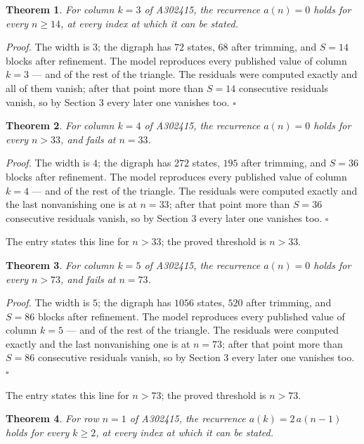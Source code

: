 \documentclass[11pt]{article}
\newtheorem{theorem}{Theorem}
\theoremstyle{definition}
\begin{document}
\begin{theorem} For column $k = 3$ of A302415, the recurrence $a(n) = 0$ holds for every $n \ge 14$, at every index at which it can be stated.\end{theorem}

{\itshape Proof.} The width is $3$; the digraph has $72$ states, $68$ after trimming, and $S = 14$ blocks after refinement. The model reproduces every published value of column $k = 3$ --- and of the rest of the triangle. The residuals were computed exactly and all of them vanish; after that point more than $S = 14$ consecutive residuals vanish, so by Section 3 every later one vanishes too. $\square$

\begin{theorem} For column $k = 4$ of A302415, the recurrence $a(n) = 0$ holds for every $n > 33$, and fails at $n = 33$.\end{theorem}

{\itshape Proof.} The width is $4$; the digraph has $272$ states, $195$ after trimming, and $S = 36$ blocks after refinement. The model reproduces every published value of column $k = 4$ --- and of the rest of the triangle. The residuals were computed exactly and the last nonvanishing one is at $n = 33$; after that point more than $S = 36$ consecutive residuals vanish, so by Section 3 every later one vanishes too. $\square$

The entry states this line for $n > 33$; the proved threshold is $n > 33$.

\begin{theorem} For column $k = 5$ of A302415, the recurrence $a(n) = 0$ holds for every $n > 73$, and fails at $n = 73$.\end{theorem}

{\itshape Proof.} The width is $5$; the digraph has $1056$ states, $520$ after trimming, and $S = 86$ blocks after refinement. The model reproduces every published value of column $k = 5$ --- and of the rest of the triangle. The residuals were computed exactly and the last nonvanishing one is at $n = 73$; after that point more than $S = 86$ consecutive residuals vanish, so by Section 3 every later one vanishes too. $\square$

The entry states this line for $n > 73$; the proved threshold is $n > 73$.

\begin{theorem} For row $n = 1$ of A302415, the recurrence $a(k) = 2\,a(n-1)$ holds for every $k \ge 2$, at every index at which it can be stated.\end{theorem}
\end{document}

